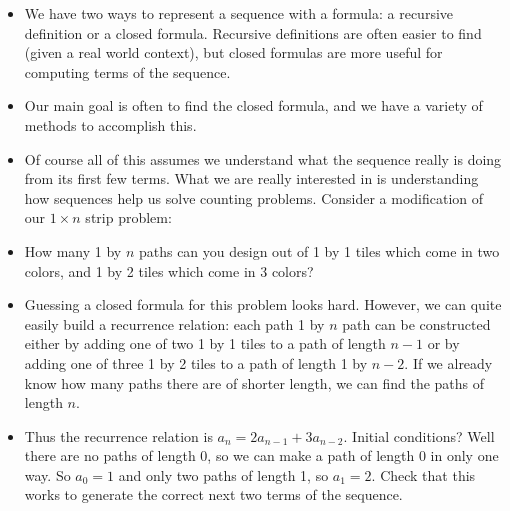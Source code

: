 \documentclass[12pt]{article}
\theoremstyle{plain}
\theoremstyle{definition}
\theoremstyle{remark}
\begin{document}
\begin{itemize}
\item We have two ways to represent a sequence with a formula: a recursive definition or a closed formula.  Recursive definitions are often easier to find (given a real world context), but closed formulas are more useful for computing terms of the sequence.
\item Our main goal is often to find the closed formula, and we have a variety of methods to accomplish this.

\item Of course all of this assumes we understand what the sequence really is doing from its first few terms.  What we are really interested in is understanding how sequences help us solve counting problems.  Consider a modification of our $1\times n$ strip problem:

  \item How many 1 by $n$ paths can you design out of 1 by 1 tiles which come in two colors, and 1 by 2 tiles which come in 3 colors?

  \item Guessing a closed formula for this problem looks hard.  However, we can quite easily build a recurrence relation: each path 1 by $n$ path can be constructed either by adding one of two 1 by 1 tiles to a path of length $n-1$ or by adding one of three 1 by 2 tiles to a path of length 1 by $n-2$.  If we already know how many paths there are of shorter length, we can find the paths of length $n$.

  \item Thus the recurrence relation is $a_n = 2a_{n-1} + 3a_{n-2}$.  Initial conditions?  Well there are no paths of length 0, so we can make a path of length 0 in only one way.  So $a_0 = 1$ and only two paths of length 1, so $a_1 = 2$.  Check that this works to generate the correct next two terms of the sequence.


\end{itemize}
\end{document}
